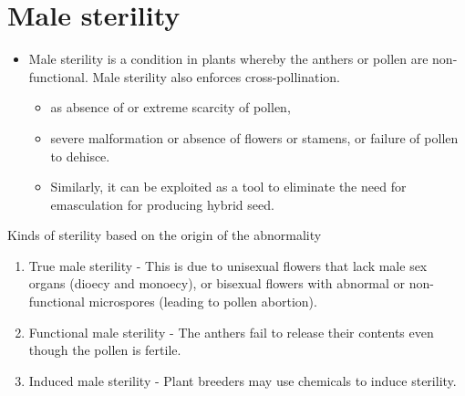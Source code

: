 \documentclass[11pt,ignorenonframetext,aspectratio=169]{beamer}
\providecommand{\tightlist}{%
  \setlength{\itemsep}{0pt}\setlength{\parskip}{0pt}}
\begin{document}
\hypertarget{male-sterility}{%
\section{Male sterility}\label{male-sterility}}

\begin{frame}{}
\protect\hypertarget{section-12}{}
\begin{itemize}
\tightlist
\item
  Male sterility is a condition in plants whereby the anthers or pollen
  are non-functional. Male sterility also enforces cross-pollination.

  \begin{itemize}
  \tightlist
  \item
    as absence of or extreme scarcity of pollen,
  \item
    severe malformation or absence of flowers or stamens, or failure of
    pollen to dehisce.
  \item
    Similarly, it can be exploited as a tool to eliminate the need for
    emasculation for producing hybrid seed.
  \end{itemize}
\end{itemize}
\end{frame}

\begin{frame}{Kinds of sterility based on the origin of the abnormality}
\protect\hypertarget{kinds-of-sterility-based-on-the-origin-of-the-abnormality}{}
\begin{enumerate}
\tightlist
\item
  True male sterility - This is due to unisexual flowers that lack male
  sex organs (dioecy and monoecy), or bisexual flowers with abnormal or
  non-functional microspores (leading to pollen abortion).
\item
  Functional male sterility - The anthers fail to release their contents
  even though the pollen is fertile.
\item
  Induced male sterility - Plant breeders may use chemicals to induce
  sterility.
\end{enumerate}
\end{frame}
\end{document}
